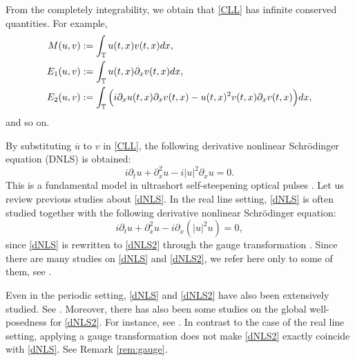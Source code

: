 \documentclass[%
11pt,  reqno]{amsart}
\newcommand{\T}{\mathbb{T}}
\newcommand{\cj}{\overline}
\newcommand{\dx}{\partial_x}
\newcommand{\dt}{\partial_t}
\numberwithin{equation}{section}
\numberwithin{theorem}{section}
\begin{document}
From the completely integrability, we obtain that \eqref{CLL} has infinite conserved quantities.
For example,
\begin{align}
M(u,v) &:= \int_\T u(t,x) v(t,x) dx,
\label{conser}
\\
E_1(u,v) &:= \int_\T  u(t,x) \dx v(t,x) dx,
\notag
\\
E_2(u,v) &:= \int_\T \Big( i \dx u (t,x) \dx v (t,x) - u(t,x)^2 v(t,x) \dx v(t,x) \Big) dx,
\notag
\end{align}
and so on.

By substituting $\cj u$ to $v$ in \eqref{CLL}, the following derivative nonlinear Schr\"odinger equation (DNLS) is obtained:
\begin{equation}
i \dt u + \dx^2 u - i |u|^2 \dx u = 0.
\label{dNLS}
\end{equation}
This is a fundamental model in ultrashort self-steepening optical pulses \cite{MMW07}. 
Let us review previous studies about \eqref{dNLS}.
In the real line setting,
\eqref{dNLS} is often studied together with the following derivative nonlinear Schr\"odinger equation:
\begin{equation}
i \dt u + \dx^2 u - i \dx (|u|^2 u) = 0,
\label{dNLS2}
\end{equation}
since \eqref{dNLS} is rewritten to \eqref{dNLS2} through the gauge transformation 
\cite{Ku84, Ha93}.
Since there are many studies on \eqref{dNLS} and \eqref{dNLS2}, we refer here only to some of them,
see \cite{TsFu80, TsFu81, Ha93, Ta99, GuWu17, JLPS20, BaPe22, KNV23, HKNV26}.

Even in the periodic setting, 
\eqref{dNLS} and \eqref{dNLS2} have also been extensively studied.
See \cite{TsFu80, TsFu81, He06, GrHe08, AmSi15}.
Moreover, there has also been some studies on the global well-posedness for \eqref{dNLS2}.
For instance, see  \cite{Mo17, KNV23, BaPe24}.
In contrast to the case of the real line setting, 
applying a gauge transformation does not make \eqref{dNLS2} exactly coincide with \eqref{dNLS}.
See Remark \ref{rem:gauge}.
\end{document}
